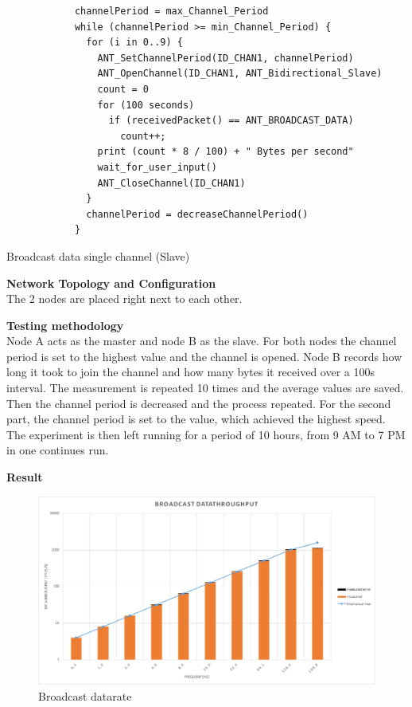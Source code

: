 \begin{description}
		\begin{code}[H]
			\begin{verbatim}
			channelPeriod = max_Channel_Period
			while (channelPeriod >= min_Channel_Period) {
			  for (i in 0..9) {
			    ANT_SetChannelPeriod(ID_CHAN1, channelPeriod)
			    ANT_OpenChannel(ID_CHAN1, ANT_Bidirectional_Slave)
			    count = 0
			    for (100 seconds) 
			      if (receivedPacket() == ANT_BROADCAST_DATA)
			        count++;			  
			    print (count * 8 / 100) + " Bytes per second"
			    wait_for_user_input()
			    ANT_CloseChannel(ID_CHAN1)
			  }
			  channelPeriod = decreaseChannelPeriod()
			}
			\end{verbatim}
			\caption{Broadcast data single channel (Slave)}\label{lst:sExp1}
		\end{code}	
	\item{\textbf{Network Topology and Configuration}} \hfill \\ The 2 nodes are placed right next to each other.
	 \item{\textbf{Testing methodology}} \hfill \\Node A acts as the master and node B as the slave. For both nodes the channel period is set to the highest value and the channel is opened. Node B records how long it took to join the channel and how many bytes it received over a 100s interval. The measurement is repeated 10 times and the average values are saved. Then the channel period is decreased and the process repeated. For the second part, the channel period is set to the value, which achieved the highest speed. The experiment is then left running for a period of 10 hours, from 9 AM to 7 PM in one continues run.
	\item{\textbf{Result}} \hfill \\  
	\begin{figure}[H]
	\centering
	\includegraphics[scale=0.5]{./pics/exp1_norm.png}
	\caption{Broadcast datarate}\label{fig:exp1norm}
	\end{figure}
	

\end{description}
